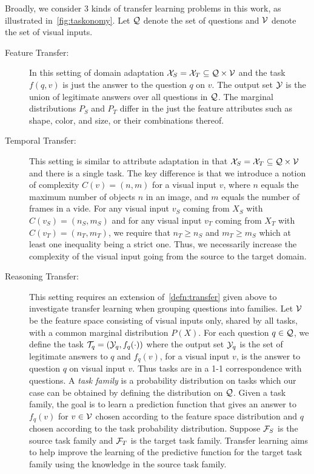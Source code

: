 Broadly, we consider 3 kinds of transfer learning problems in this work, as illustrated in~\cref{fig:taskonomy}. 
Let $\mathcal{Q}$ denote the set of questions and $\mathcal{V}$ denote the set of visual inputs.
\begin{description}
	\item[Feature Transfer:] In this setting of domain adaptation $\mathcal{X}_S = \mathcal{X}_T \subseteq \mathcal{Q} \times \mathcal{V}$
	and the task $f(q,v)$ is just the answer to the question $q$ on $v$. The output set $\mathcal{Y}$ is the union of legitimate answers
	over all questions in $\mathcal{Q}$.
	The marginal distributions $P_S$ and $P_T$ differ in the just the feature attributes such as shape, color, and size, or their combinations
	thereof.
	
	\item[Temporal Transfer:] This setting is similar to attribute adaptation in that $\mathcal{X}_S = \mathcal{X}_T \subseteq \mathcal{Q} \times \mathcal{V}$
	and there is a single task.
	The key difference is that we introduce a notion of complexity $C(v) = (n, m)$ for a visual input $v$,
	where $n$ equals the maximum number of objects $n$ in an image, and $m$
	equals  the number of frames in a vide. 
	For any visual input $v_S$ coming from $X_S$ with $C(v_S) = (n_S, m_S)$
	and for any visual input $v_T$ coming from $X_T$ with $C(v_T) = (n_T, m_T)$, we require that $n_T \ge n_S$ and 
	$m_T \ge m_S$ which at least one inequality being a strict one. 
	Thus, we necessarily increase the complexity of the visual input going from the source to the target domain.
	
	\item[Reasoning Transfer:]
	This setting requires an extension of~\cref{defn:transfer} given above to investigate transfer learning when
	grouping questions into families. Let $\mathcal{V}$ be the feature space consisting of visual inputs only, shared by
	all tasks, with a common marginal distribution $P(X)$. For each question $q \in \mathcal{Q}$, we define the task 
	$\mathcal{T}_q = (\mathcal{Y}_q, f_q(\cdot))$ where
	the output set $\mathcal{Y}_q$ is the set of legitimate answers to $q$ and $f_q(v)$, for a visual input $v$, 
	is the answer to question $q$ on visual input $v$.
	Thus tasks are in a 1-1 correspondence with questions.
	A \emph{task family} is a probability distribution on tasks which our case can be obtained by defining the distribution on $\mathcal{Q}$. 
	Given a task family, the goal is to learn a prediction function that gives an answer to $f_q(v)$ for $v \in \mathcal{V}$ chosen according 
	to the feature space distribution and $q$ chosen according to the task probability distribution.
	Suppose $\mathcal{F}_S$ is the source task family and $\mathcal{F}_T$ is the target task family.
	Transfer learning aims to help improve the learning of the predictive function for the target task family 
	using the knowledge in the source task family.
	
\end{description}


